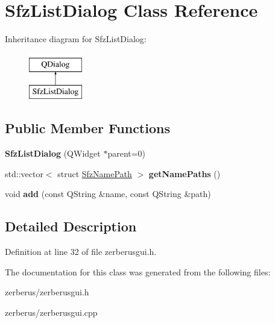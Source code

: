 \hypertarget{class_sfz_list_dialog}{}\section{Sfz\+List\+Dialog Class Reference}
\label{class_sfz_list_dialog}
Inheritance diagram for Sfz\+List\+Dialog\+:\begin{figure}[H]
\begin{center}
\leavevmode
\includegraphics[height=2.000000cm]{class_sfz_list_dialog}
\end{center}
\end{figure}
\subsection*{Public Member Functions}
\begin{DoxyCompactItemize}
\item 
\mbox{\label{class_sfz_list_dialog_a7f315a8ce6a55c626af1b68775b2d14f}} 
{\bfseries Sfz\+List\+Dialog} (Q\+Widget $\ast$parent=0)
\item 
\mbox{\label{class_sfz_list_dialog_a8e20b70f9f8d4fa6587bd99d94934ea2}} 
std\+::vector$<$ struct \hyperlink{struct_sfz_name_path}{Sfz\+Name\+Path} $>$ {\bfseries get\+Name\+Paths} ()
\item 
\mbox{\label{class_sfz_list_dialog_a643489f009fa5c0e7beaa5cfa6d3121f}} 
void {\bfseries add} (const Q\+String \&name, const Q\+String \&path)
\end{DoxyCompactItemize}


\subsection{Detailed Description}


Definition at line 32 of file zerberusgui.\+h.



The documentation for this class was generated from the following files\+:\begin{DoxyCompactItemize}
\item 
zerberus/zerberusgui.\+h\item 
zerberus/zerberusgui.\+cpp\end{DoxyCompactItemize}
